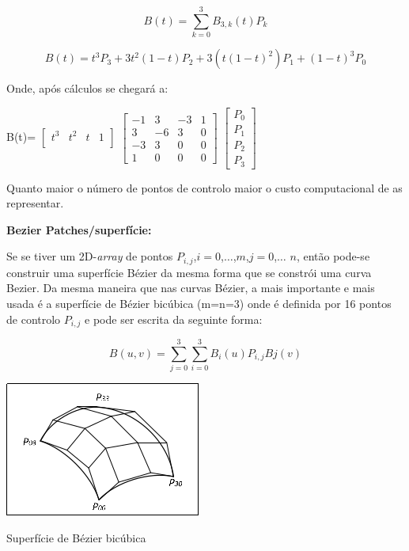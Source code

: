 \begin{equation}
B(t)=\sum_{k=0}^{3}B_{3,k}(t)P_{k}
\end{equation}

\begin{equation}
B(t)=t^{3}P_{3}+3t^{2}(1-t)P_{2}+3(t(1-t)^{2})P_{1}+(1-t)^{3}P_{0}
\end{equation}

Onde, após cálculos se chegará a:

B(t)=  $\begin{bmatrix}
       t^{3} & t^{2} & t & 1          \\[0.3em]
		\end{bmatrix}$
		$\begin{bmatrix}
		       -1 & 3 & -3  & 1           \\[0.3em]
		        3 & -6 &  3 & 0   \\[0.3em]
		       -3 & 3 & 0 & 0 \\[0.3em]
		       1 & 0 & 0 & 0
		     \end{bmatrix}$
		$\begin{bmatrix}
		       P_{0}           \\[0.3em]
		       P_{1}   \\[0.3em]
		       P_{2} \\[0.3em]
		       P_{3}
		     \end{bmatrix}$


Quanto maior o número de pontos de controlo maior o custo computacional de as representar.

{\huge \textbf{Bezier Patches/superfície:}}

Se se tiver um 2D-\emph{array} de pontos
$P_{i,j}$,$i=0$,$\ldots$,$m$,$j=0$,$\ldots$ $n$, então pode-se
construir uma superfície Bézier da mesma forma que se constrói uma curva Bezier.
Da mesma maneira que nas curvas Bézier, a mais importante e mais usada
é a superfície de Bézier bicúbica (m=n=3) onde é definida por 16 pontos de
controlo $P_{i,j}$ e pode ser escrita da seguinte forma:

\begin{equation}
B(u,v)=\sum_{j=0}^{3}\sum_{i=0}^{3}B_{i}(u)P_{i,j}B{j}(v)
\end{equation}



\begin{center}
 	
 	\includegraphics[scale=1,keepaspectratio]{resources/beziersupf.png}
 	\captionsetup{type=figure, width=0.8\linewidth}
	\caption{Superfície de Bézier bicúbica}
\label{fig:ssec1:diagram:plane:to:sphere} 
\end{center}

